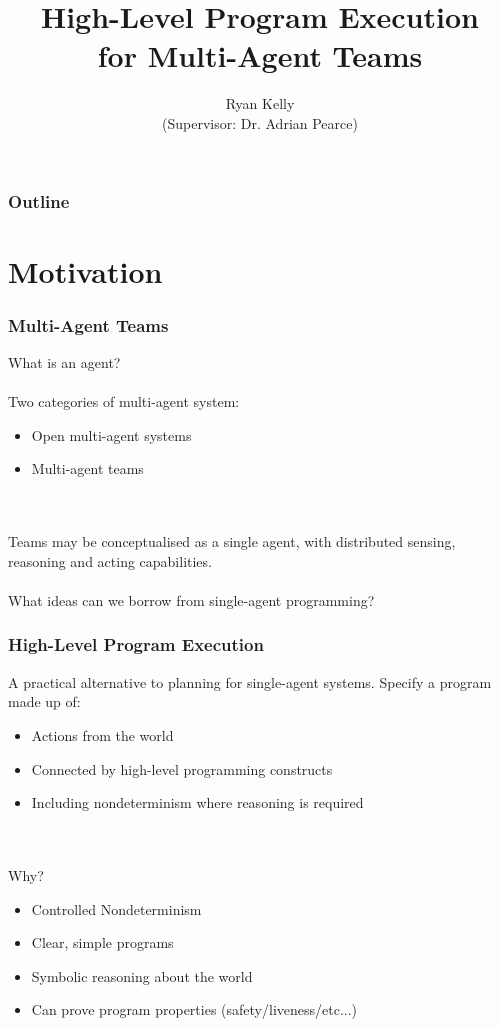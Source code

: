 \documentclass{beamer}
\title{High-Level Program Execution\\ for Multi-Agent Teams}
\author{Ryan Kelly\\ (Supervisor: Dr. Adrian Pearce)}
\begin{document}
\begin{frame}
  \titlepage
\end{frame}

\begin{frame}
  \frametitle{Outline}
  \tableofcontents
\end{frame}

\section{Motivation}

\begin{frame}
\frametitle{Multi-Agent Teams}
What is an agent?
\ \\
\ \\
Two categories of multi-agent system:
\begin{itemize}
  \item Open multi-agent systems
  \item Multi-agent teams
\end{itemize}
\ \\
\ \\
\pause
Teams may be conceptualised as a single agent, with distributed sensing,
reasoning and acting capabilities.\\
\ \\
\pause
What ideas can we borrow from single-agent programming?
\end{frame}

\begin{frame}
\frametitle{High-Level Program Execution}
A practical alternative to planning for single-agent systems. Specify
a program made up of:
\begin{itemize}
  \item Actions from the world
  \item Connected by high-level programming constructs
  \item Including nondeterminism where reasoning is required
\end{itemize}
\ \\
\ \\
\pause
Why?
\begin{itemize}
  \item Controlled Nondeterminism
  \item Clear, simple programs
  \item Symbolic reasoning about the world
  \item Can prove program properties (safety/liveness/etc...)
\end{itemize}
\end{frame}
\end{document}
